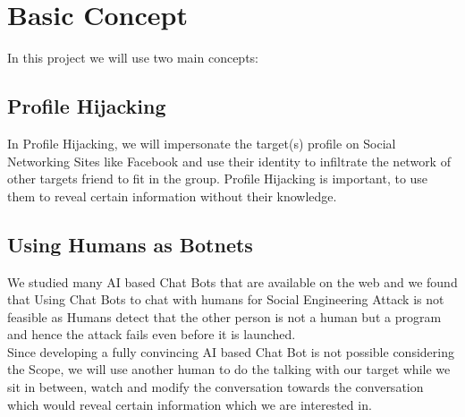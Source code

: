 
\section{Basic Concept}
In this project we will use two main concepts:

\subsection{Profile Hijacking}

In Profile Hijacking, we will impersonate the target(s) profile on Social Networking Sites like Facebook and use their identity to infiltrate the network of other targets friend to fit in the group. Profile Hijacking is important, to use them to reveal certain information without their knowledge.\cite{paper_allyourcontacts}


\subsection{Using Humans as Botnets}

We studied many AI based Chat Bots that are available on the web and we found that Using Chat Bots to chat with humans for Social Engineering Attack is not feasible as Humans detect that the other person is not a human but a program and hence the attack fails even before it is launched.\cite{paper_towardsautomating}\\[0.5cm]
Since developing a fully convincing AI based Chat Bot is not possible considering the Scope, we will use another human to do the talking with our target while we sit in between, watch and modify the conversation towards the conversation which would reveal certain information which we are interested in.\cite{paper_honeybot}


